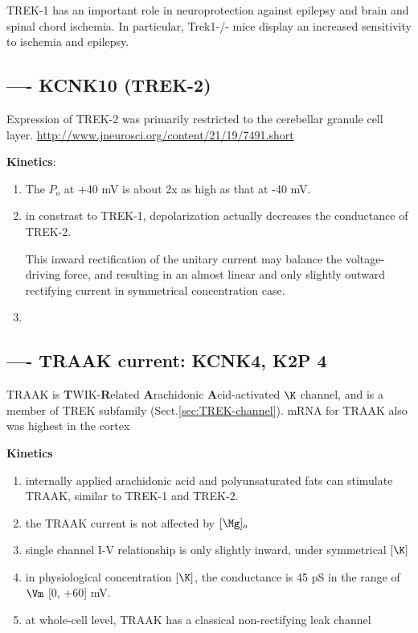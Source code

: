 TREK-1 has an important role in neuroprotection against epilepsy and brain and
spinal chord ischemia. In particular, Trek1-/- mice display an increased
sensitivity to ischemia and epilepsy.

\subsection{---- KCNK10 (TREK-2)}
\label{sec:TREK-2-channel}
\label{sec:KCNK10}

Expression of TREK-2 was primarily restricted to the cerebellar granule cell
layer.  \url{http://www.jneurosci.org/content/21/19/7491.short}
 
{\bf Kinetics}:
\begin{enumerate}
  \item The $P_o$ at +40 mV is about 2x as high as that at -40 mV.
  
  \item in constrast to TREK-1, depolarization actually decreases the
  conductance of TREK-2.
  
This inward rectification of the unitary current may balance the voltage-driving
force, and resulting in an almost linear and only slightly outward rectifying
current in symmetrical concentration case.

  \item 
\end{enumerate}

\subsection{---- TRAAK current: KCNK4, K2P 4}
\label{sec:TRAAK-channel}
\label{sec:KCNK4}

TRAAK is {\bf T}WIK-{\bf R}elated {\bf A}rachidonic {\bf A}cid-activated $\K$
channel, and is a member of TREK subfamily (Sect.\ref{sec:TREK-channel}). mRNA
for TRAAK also was highest in the cortex

{\bf Kinetics}
\begin{enumerate}
  \item internally applied arachidonic acid and polyunsaturated fats can
  stimulate TRAAK, similar to TREK-1 and TREK-2.

  \item the TRAAK current is not affected by $[\Mg]_o$
  
  \item single channel I-V relationship is only slightly inward, under
  symmetrical $[\K]$
  
  \item in physiological concentration $[\K]$, the conductance is 45 pS in the
  range of $\Vm$ [0, +60] mV. 
  
  \item at whole-cell level, TRAAK has a classical non-rectifying leak channel
\end{enumerate}

